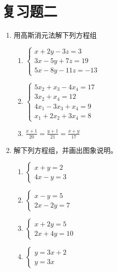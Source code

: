 \section*{复习题二}
\begin{enumerate}
    \item 用高斯消元法解下列方程组

    \begin{multicols}{2}
        \begin{enumerate}
        \item $\begin{cases}
            x+2y-3z=3\\3x-5y+7z=19\\5x-8y-11z=-13
        \end{cases}$
        \item $\begin{cases}
            5x_2+x_3-4x_4=17\\3x_2+x_4=12\\
            4x_1-3x_3+x_4=9\\ x_1+2x_2+3x_4=8
        \end{cases}$
        \item $\frac{x+1}{20}=\frac{y+1}{21}=\frac{x+y}{17}$
    \end{enumerate}
    \end{multicols}
    
    
    \item 解下列方程组，并画出图象说明。
    \begin{multicols}{2}
    \begin{enumerate}
        \item $\begin{cases}
            x+y=2\\4x-y=3
        \end{cases}$
        \item $\begin{cases}
            x-y=5\\2x-2y=7
        \end{cases}$
        \item $\begin{cases}
            x+2y=5\\2x+4y=10
        \end{cases}$
        \item $\begin{cases}
            y=3x+2\\y=3x
        \end{cases}$
    \end{enumerate}
    \end{multicols}


\end{enumerate}
